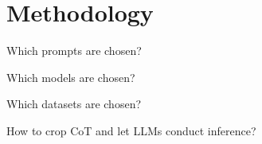 \section{Methodology}
Which prompts are chosen?

Which models are chosen?

Which datasets are chosen?

How to crop CoT and let LLMs conduct inference?
